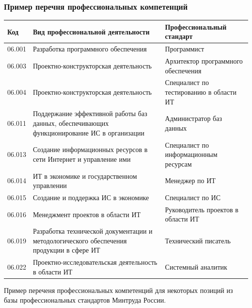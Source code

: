 \documentclass{../industrial-development}
\begin{document}
\begin{frame} \frametitle{Пример перечня профессиональных компетенций}
	\begin{table}[h]
\begin{center}
\begin{tabular}{|p{}|p{5cm}|p{}|}
\hline
\tiny \textbf{Код}   & \tiny \textbf{Вид профессиональной деятельности} & \tiny \textbf{Профессиональный стандарт} \\
\hline
\tiny  06.001 & \tiny Разработка программного обеспечения & \tiny Программист \\
\hline
\tiny  06.003 & \tiny Проектно-конструкторская деятельность & \tiny Архитектор программного обеспечения \\
\hline
\tiny  06.004 & \tiny Проектно-конструкторская деятельность & \tiny Специалист по тестированию в области ИТ \\
\hline
\tiny  06.011 & \tiny Поддержание эффективной работы баз данных, обеспечивающих функционирование ИС в организации & \tiny Администратор баз данных \\
\hline
\tiny  06.013 & \tiny Создание информационных ресурсов в сети Интернет и управление ими & \tiny Специалист по информационным ресурсам \\
\hline
\tiny  06.014 & \tiny ИТ в экономике и государственном управлении & \tiny Менеджер по ИТ \\
\hline
\tiny  06.015 & \tiny Создание и поддержка ИС в экономике & \tiny Специалист по ИС \\
\hline
\tiny  06.016 & \tiny Менеджмент проектов в области ИТ & \tiny Руководитель проектов в области ИТ \\
\hline
\tiny  06.019 & \tiny Разработка технической документации и методологического обеспечения продукции в сфере ИТ & \tiny Технический писатель \\
\hline
\tiny  06.022 & \tiny Проектно-исследовательская деятельность в области ИТ & \tiny Системный аналитик \\
\hline
\end{tabular}
\end{center}
\end{table}

\end{frame}

\lecturenotes

Пример переченя профессиональных компетенций для некоторых позиций из базы профессиональных стандартов Минтруда России.
\end{document}
